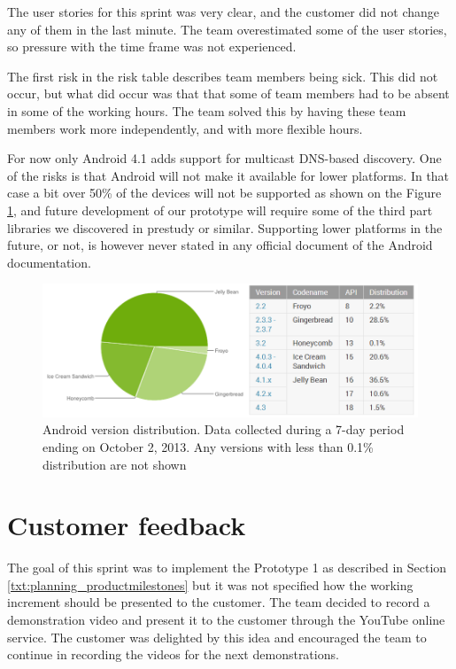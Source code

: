 The user stories for this sprint was very clear, and the customer did not change any of them in the last minute. The team overestimated some of the user stories, so pressure with the time frame was not experienced.

The first risk in the risk table describes team members being sick. This did not occur, but what did occur was that that some of team members had to be absent in some of the working hours. 
The team solved this by having these team members work more independently, and with more flexible hours.  

For now only Android 4.1 adds support for multicast DNS-based discovery.
One of the risks is that Android will not make it available for lower platforms.
In that case a bit over 50\% of the devices will not be supported as shown on the Figure \ref{fig:Platform_chart }, and future development of our prototype will require some of the third part libraries we discovered in prestudy or similar.
Supporting lower platforms in the future, or not, is however never stated in any official document of the Android documentation.

\begin{figure}[H]
	\centering
		\includegraphics[width=16cm]{sprint1/android_platform_chart.png}
	\caption[Android version distribution]{Android version distribution\footnotemark. Data collected during a 7-day period ending on October 2, 2013. 
	Any versions with less than 0.1\% distribution are not shown}
	\label{fig:Platform_chart }
\end{figure}

\section{Customer feedback}
The goal of this sprint was to implement the Prototype 1 as described in Section \ref{txt:planning_productmilestones} but it was not specified how the working increment should be presented to the customer. The team decided to record a demonstration video and present it to the customer through the YouTube online service. The customer was delighted by this idea and encouraged the team to continue in recording the videos for the next demonstrations.

